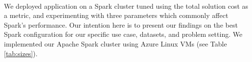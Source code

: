 {%
\paragraph{\sparkdi{}}
We deployed \sparkdi{} application on a Spark cluster tuned using the total solution cost as a metric, and experimenting with three parameters which commonly affect Spark's performance. Our intention here is to present our findings on the best Spark configuration for our specific use case, datasets, and problem setting. We implemented our Apache Spark cluster using Azure Linux VMs (see Table \ref{tab:sizes}).

\begin{figure}[t!]
   \\
\end{figure}}
